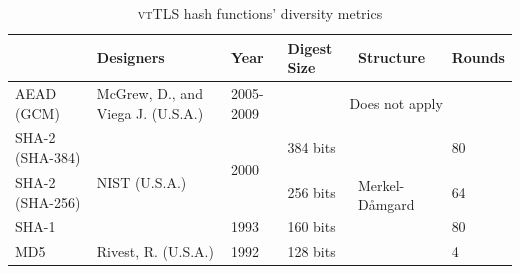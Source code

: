 \documentclass{sig-alternate-05-2015}
\begin{document}
\begin{table}[tb]
\center\footnotesize
\begin{tabular}{l|l|l|l|l|l|}
\cline{2-6}
                                      & Designers                         & Year                  & Digest Size & Structure                           & Rounds \\ \hline
\multicolumn{1}{|l|}{AEAD (GCM)}      & McGrew, D., and Viega J. (U.S.A.) & 2005-2009             & \multicolumn{3}{c|}{Does not apply}                        \\ \hline
\multicolumn{1}{|l|}{SHA-2 (SHA-384)} & \multirow{3}{*}{NIST (U.S.A.)}    & \multirow{2}{*}{2000} & 384 bits    & \multirow{4}{*}{Merkel-D\r{a}mgard} & 80     \\ \cline{1-1} \cline{4-4} \cline{6-6} 
\multicolumn{1}{|l|}{SHA-2 (SHA-256)} &                                   &                       & 256 bits    &                                     & 64     \\ \cline{1-1} \cline{3-4} \cline{6-6} 
\multicolumn{1}{|l|}{SHA-1}           &                                   & 1993                  & 160 bits    &                                     & 80     \\ \cline{1-4} \cline{6-6} 
\multicolumn{1}{|l|}{MD5}             & Rivest, R. (U.S.A.)               & 1992                  & 128 bits    &                                     & 4      \\ \hline
\end{tabular}
\caption{\textsc{vtTLS} hash functions' diversity metrics}
\label{table:vttls-hash}
\end{table}
\end{document}
